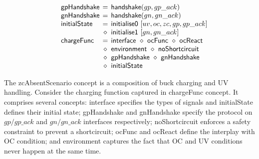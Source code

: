 \documentclass[british, journal]{IEEEtran}
\begin{document}
\[\begin{array}{lcl}
~~~~\mathsf{gpHandshake}&\hspace{-2mm}=&\hspace{-2mm}\mathsf{handshake}(gp,gp\_ack)\\

~~~~\mathsf{gnHandshake}&\hspace{-2mm}=&\hspace{-2mm}\mathsf{handshake}(gn,gn\_ack)\\

~~~~\mathsf{initialState}&\hspace{-2mm}=&\hspace{-2mm}\mathsf{initialise0}~[uv,oc,zc,gp,gp\_ack]\\
~&\hspace{-2mm}\diamond&\hspace{-2mm}\mathsf{initialise1}~[gn,gn\_ack]\\

~~~~\mathsf{chargeFunc}&\hspace{-2mm}=&\hspace{-2mm}\mathsf{interface}~\diamond~\mathsf{ocFunc}~\diamond~\mathsf{ocReact}\\
~&\hspace{-2mm}\diamond&\hspace{-2mm}\mathsf{environment}~\diamond~\mathsf{noShortcircuit}\\
~&\hspace{-2mm}\diamond&\hspace{-2mm}\mathsf{gpHandshake}~\diamond~\mathsf{gnHandshake}\\
~&\hspace{-2mm}\diamond&\hspace{-2mm}\mathsf{initialState}

\end{array}
\]

The \textsf{zcAbsentScenario} concept is a composition of buck charging and UV handling.
Consider the charging function captured in \textsf{chargeFunc} concept.
It comprises several concepts: \textsf{interface} specifies the types
of signals and \textsf{initialState} defines their initial state;
\textsf{gpHandshake} and \textsf{gnHandshake} specify the protocol on $gp/gp\_ack$
and $gn/gn\_ack$ interfaces respectively;
\textsf{noShortcircuit} enforces a safety constraint to prevent a shortcircuit;
\textsf{ocFunc} and \textsf{ocReact} define the interplay with OC condition;
and \textsf{environment} captures the fact that OC and UV conditions never happen at the same time.
\end{document}
